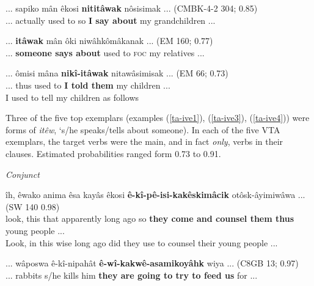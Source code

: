     \begin{exe}
    \ex
    \gll ... sapiko mân êkosi \textbf{nititâwak} nôsisimak ... \tiny{(CMBK-4-2 304; 0.85)} \\
        ... actually {used to} so {\textbf{I say about}} {my grandchildren}  ... \\
    \trans  
    \label{ta-ive3}
    \end{exe}

    
    \begin{exe}
    \ex
    \gll ... \textbf{itâwak} mân ôki niwâhkômâkanak ... \tiny{(EM 160; 0.77)} \\
         ... {\textbf{someone says about}} {used to} \textsc{foc}  {my relatives} ...\\
    \trans  
    \label{ta-ive5}
    \end{exe}

    \begin{exe}
    \ex
    \gll ... ômisi mâna \textbf{nikî-itâwak} nitawâsimisak ... \tiny{(EM 66; 0.73)} \\
         ... thus {used to} {\textbf{I told them}} {my children} ...\\
    \trans   I used to tell my children as follows \tiny{\citep[36]{Minde1997kwayask}}
    \label{ta-ive4}
    \end{exe}

    
     Three of the five top exemplars (examples (\ref{ta-ive1}), (\ref{ta-ive3}), (\ref{ta-ive4})) were forms of \textit{itêw}, `s/he speaks/tells about someone). In each of the five VTA exemplars, the target verbs were the main, and in fact \textit{only}, verbs in their clauses. Estimated probabilities ranged form 0.73 to 0.91.
    
    \textit{Conjunct}
    
    \begin{exe}
    \ex
    \gll îh, êwako anima êsa kayâs êkosi \textbf{ê-kî-pê-isi-kakêskimâcik} otôsk-âyimiwâwa ... \tiny{(SW 140 0.98)} \\
        look, this that apparently {long ago} so {\textbf{they come and counsel them thus}} {young people} ... \\
    \trans   Look, in this wise long ago did they use to counsel their young people ... \tiny{\citep[76-77]{Whitecalf1993}} \\
    \label{ta-ive6}
    \end{exe}
    
    \begin{exe}
    \ex
    \gll ... wâposwa ê-kî-nipahât \textbf{ê-wî-kakwê-asamikoyâhk} wiya ... (C8GB 13; 0.97) \\
         ... rabbits s/he kills him {\textbf{they are going to try to feed us}} for ... \\
    \trans    \\
    \label{ta-ive7}
    \end{exe}    
    
